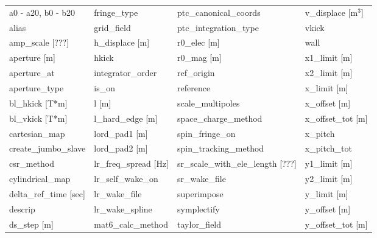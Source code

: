  \begin{tabular}{llll} \toprule
a0 - a20, b0 - b20             & fringe_type                    & ptc_canonical_coords           & v_displace [m$^3$]             \\
alias                          & grid_field                     & ptc_integration_type           & vkick                          \\
amp_scale [???]                & h_displace [m]                 & r0_elec [m]                    & wall                           \\
aperture [m]                   & hkick                          & r0_mag [m]                     & x1_limit [m]                   \\
aperture_at                    & integrator_order               & ref_origin                     & x2_limit [m]                   \\
aperture_type                  & is_on                          & reference                      & x_limit [m]                    \\
bl_hkick [T*m]                 & l [m]                          & scale_multipoles               & x_offset [m]                   \\
bl_vkick [T*m]                 & l_hard_edge [m]                & space_charge_method            & x_offset_tot [m]               \\
cartesian_map                  & lord_pad1 [m]                  & spin_fringe_on                 & x_pitch                        \\
create_jumbo_slave             & lord_pad2 [m]                  & spin_tracking_method           & x_pitch_tot                    \\
csr_method                     & lr_freq_spread [Hz]            & sr_scale_with_ele_length [???] & y1_limit [m]                   \\
cylindrical_map                & lr_self_wake_on                & sr_wake_file                   & y2_limit [m]                   \\
delta_ref_time [sec]           & lr_wake_file                   & superimpose                    & y_limit [m]                    \\
descrip                        & lr_wake_spline                 & symplectify                    & y_offset [m]                   \\
ds_step [m]                    & mat6_calc_method               & taylor_field                   & y_offset_tot [m]               \\

\end{tabular}
